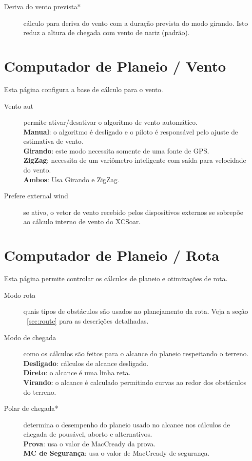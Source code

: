 \begin{description}
\item[Deriva do vento prevista*]  \label{conf:predict-drift}cálculo para deriva do vento com a duração prevista do modo girando.  Isto reduz a altura de chegada com vento de nariz (padrão).
\end{description}


\section{Computador de Planeio / Vento} \label{sec:wind}

Esta página configura a base de cálculo para o vento.

\begin{description}
\item[Vento aut]  \label{conf:autowind} permite ativar/desativar o algoritmo de vento automático. \\
  {\bf Manual}: o algoritmo é desligado e o piloto é responsável pelo ajuste de estimativa de vento. \\
  {\bf Girando}: este modo necessita somente de uma fonte de GPS. \\
  {\bf ZigZag}: necessita de um variômetro inteligente com saída para velocidade do vento. \\
  {\bf Ambos}:  Usa  Girando e ZigZag.
\item[Prefere external wind]  se ativo, o vetor de vento recebido pelos dispositivos externos se sobrepõe ao cálculo interno de vento do XCSoar.
\end{description}


\section{Computador de Planeio / Rota}

Esta página permite controlar os cálculos de planeio e otimizações de rota.

\begin{description}
\item[Modo rota]  \label{conf:routemode} quais tipos de obstáculos são usados no planejamento da rota.  Veja a seção ~\ref{sec:route} 
para as descrições detalhadas.
\item[Modo de chegada]  \label{conf:turningreach} como os cálculos são feitos para o alcance do planeio respeitando o terreno. \\
  {\bf Desligado}: cálculos de alcance desligado. \\
  {\bf Direto}: o alcance é uma linha reta. \\
  {\bf Virando}: o alcance é calculado permitindo curvas ao redor dos obstáculos do terreno.
\item[Polar de chegada*]  \label{conf:reachpolar} determina o desempenho do planeio usado no alcance nos cálculos de chegada de pousável, aborto e alternativos. \\
  {\bf Prova}: usa o valor de MacCready da prova. \\
  {\bf MC de Segurança}: usa o valor de MacCready de segurança.
\end{description}

